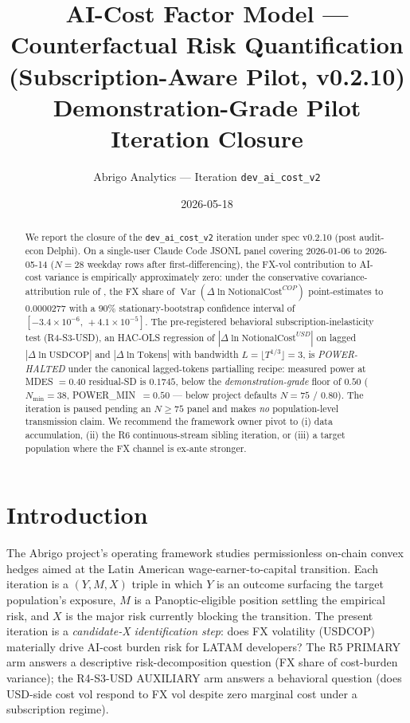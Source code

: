 \documentclass[11pt,letterpaper]{article}
\title{AI-Cost Factor Model --- Counterfactual Risk Quantification
  (Subscription-Aware Pilot, v0.2.10)\\[0.4em]
  \large Demonstration-Grade Pilot Iteration Closure}
\author{Abrigo Analytics --- Iteration \texttt{dev\_ai\_cost\_v2}}
\date{2026-05-18}
\newcommand{\Var}{\operatorname{Var}}
\newcommand{\dln}{\Delta\ln}
\newcommand{\NotionalCop}{\text{NotionalCost}^{COP}}
\newcommand{\NotionalUsd}{\text{NotionalCost}^{USD}}
\begin{document}
\maketitle

\begin{abstract}
We report the closure of the \texttt{dev\_ai\_cost\_v2} iteration under
spec v0.2.10 (post audit-econ Delphi). On a single-user Claude Code
JSONL panel covering 2026-01-06 to 2026-05-14 (\(N = 28\) weekday rows
after first-differencing), the FX-vol contribution to AI-cost variance
is empirically approximately zero: under the conservative
covariance-attribution rule of \citet{PolitisRomano1994}, the FX share
of \(\Var(\dln\NotionalCop)\) point-estimates to \(0.0000277\) with a
\(90\%\) stationary-bootstrap confidence interval of
\([-3.4\!\times\!10^{-6},\,+4.1\!\times\!10^{-5}]\). The pre-registered
behavioral subscription-inelasticity test (R4-S3-USD), an HAC-OLS
regression of \(|\dln\NotionalUsd|\) on lagged \(|\dln\text{USDCOP}|\)
and \(|\dln\text{Tokens}|\) with \citet{NeweyWest1987} bandwidth
\(L = \lfloor T^{1/3} \rfloor = 3\), is \emph{POWER-HALTED} under the
canonical lagged-tokens partialling recipe: measured power at MDES
\(= 0.40\) residual-SD is \(0.1745\), below the
\emph{demonstration-grade} floor of \(0.50\) (\(N_{\min}=38\),
\textsc{POWER\_MIN}~\(=0.50\) --- below project defaults
\(N=75\) / \(0.80\)). The iteration is paused pending an
\(N \geq 75\) panel and makes \emph{no} population-level transmission
claim. We recommend the framework owner pivot to (i) data accumulation,
(ii) the R6 continuous-stream sibling iteration, or (iii) a target
population where the FX channel is ex-ante stronger.
\end{abstract}

\section{Introduction}
\label{sec:intro}

The Abrigo project's operating framework studies permissionless on-chain
convex hedges aimed at the Latin American wage-earner-to-capital
transition. Each iteration is a \((Y, M, X)\) triple in which
\(Y\) is an outcome surfacing the target population's exposure,
\(M\) is a Panoptic-eligible position settling the empirical risk, and
\(X\) is the major risk currently blocking the transition. The
present iteration is a \emph{candidate-X identification step}: does
FX volatility (USDCOP) materially drive AI-cost burden risk for
LATAM developers? The R5 PRIMARY arm answers a descriptive
risk-decomposition question (FX share of cost-burden variance); the
R4-S3-USD AUXILIARY arm answers a behavioral question (does USD-side
cost vol respond to FX vol despite zero marginal cost under a
subscription regime).
\end{document}
